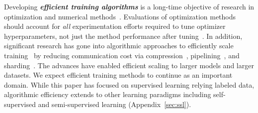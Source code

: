 Developing \textbf{\textit{efficient training algorithms}} is a long-time objective of research in optimization and numerical methods~\cite{nemirovskij1983problem}. 
Evaluations of optimization methods should account for \textit{all} experimentation efforts required to tune optimizer hyperparameters, not just the method performance after tuning~\cite{choi2019empirical,sivaprasad2020optimizer}. 
In addition, 
significant research has gone into algorithmic approaches to efficiently scale training~\cite{goyal2017accurate,ott2018scaling} by reducing communication cost via compression~\cite{alistarh2017qsgd,vogels2019powersgd}, pipelining~\cite{huang2019gpipe}, and sharding~\cite{rajbhandari2020zero,rasley2020deepspeed}. The advances have enabled efficient scaling to larger models and larger datasets. 
We expect efficient training methods to continue as an important domain.
While this paper has focused on supervised learning relying labeled data,   
algorithmic efficiency extends to other learning paradigms including self-supervised and semi-supervised learning (Appendix~\ref{sec:ssl}).


